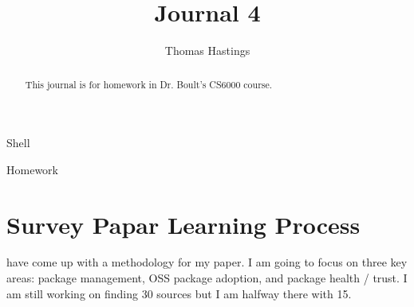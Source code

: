 \documentclass[journal]{IEEEtran}
\begin{document}
  \title{Journal 4}
  \author{Thomas Hastings}%
  
  {Shell}
  \maketitle
  
  \begin{abstract}
  This journal is for homework in Dr. Boult's CS6000 course.
  \end{abstract}
  
  \begin{IEEEkeywords}
  Homework
  \end{IEEEkeywords}
  
  
  \section{Survey Papar Learning Process}
   have come up with a methodology for my paper. I am going to focus on three key areas: package management, OSS package adoption, and package health / trust. I am still working on finding 30 sources but I am halfway there with 15.
  
  
\end{document}
